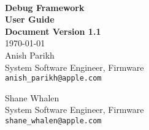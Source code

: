 
\begin{titlepage}

\setlength{\parindent}{0in}

{
	\fontsize{32}{32}\selectfont
	\textcolor{AppleGray}{\AppleLogo}
}
\\[0.25in]

{
	\fontsize{32}{32}\selectfont
	\textcolor{SmokeyDarkBlue}{\bfseries Debug Framework} \\[0.3ex]
	\textbf{User Guide}
}
\\[0.25in]

\textbf{Document Version 1.1} \\
\today
\\[0.25in]

Anish Parikh \\
System Software Engineer, Firmware \\
\texttt{anish\_parikh@apple.com}

Shane Whalen\\
System Software Engineer, Firmware \\
\texttt{shane\_whalen@apple.com}

\vfill

\begin{center}
\end{center}

\end{titlepage}
